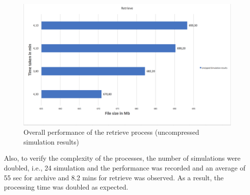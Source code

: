 \begin{figure}[H]
    \centering \includegraphics[scale=0.5]{grafiken/retrieveUnzip.png}
    \caption{Overall performance of the retrieve process (uncompressed simulation results)}
    \label{fig:restorePerformanceUn}
\end{figure}

Also, to verify the complexity of the processes, the number of simulations were doubled, i.e., 24 simulation and the performance was recorded
and an average of 55 sec for archive and 8.2 mins for retrieve was observed. As a result, the processing time was doubled as expected.